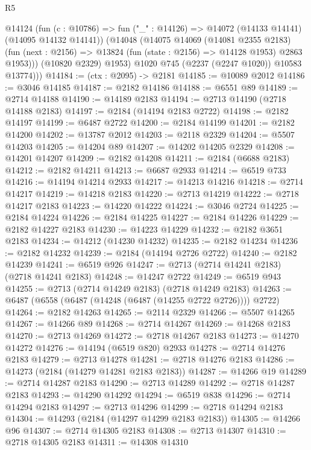 \begin{lexlean}{R5}
\begin{coremodule}
          @14124
            (fun (c : @10786) =>
            fun ("_" : @14126) => @14072 (@14133 @14141) (@14095 @14132 @14141))
            (@14048
              (@14075
                @14069
                (@14081 @2355 @2183)
                (fun (next : @2156) => @13824 (fun (state : @2156) => @14128 @1953) @2863 @1953)))
            (@10820 @2329)
            @1953)
          @1020
          @745
          (@2237 (@2247 @1020))
          @10583
          @13774)))
@14184 := (ctx : @2095) -> @2181
@14185 := @10089 @2012
@14186 := @3046 @14185
@14187 := @2182 @14186
@14188 := @6551 @89
@14189 := @2714 @14188
@14190 := @14189 @2183
@14194 := @2713 @14190 (@2718 @14188 @2183)
@14197 := @2184 (@14194 @2183 @2722)
@14198 := @2182 @14197
@14199 := @6487 @2722
@14200 := @2184 @14199
@14201 := @2182 @14200
@14202 := @13787 @2012
@14203 := @2118 @2329
@14204 := @5507 @14203
@14205 := @14204 @89
@14207 := @14202 @14205 @2329
@14208 := @14201 @14207
@14209 := @2182 @14208
@14211 := @2184 (@6688 @2183)
@14212 := @2182 @14211
@14213 := @6687 @2933
@14214 := @6519 @733
@14216 := @14194 @14214 @2933
@14217 := @14213 @14216
@14218 := @2714 @14217
@14219 := @14218 @2183
@14220 := @2713 @14219
@14222 := @2718 @14217 @2183
@14223 := @14220 @14222
@14224 := @3046 @2724
@14225 := @2184 @14224
@14226 := @2184 @14225
@14227 := @2184 @14226
@14229 := @2182 @14227 @2183
@14230 := @14223 @14229
@14232 := @2182 @3651 @2183
@14234 := @14212 (@14230 @14232)
@14235 := @2182 @14234
@14236 := @2182 @14232
@14239 := @2184 (@14194 @2726 @2722)
@14240 := @2182 @14239
@14241 := @6519 @926
@14247 := @2713 (@2714 @14241 @2183) (@2718 @14241 @2183)
@14248 := @14247 @2722
@14249 := @6519 @943
@14255 := @2713 (@2714 @14249 @2183) (@2718 @14249 @2183)
@14263 := @6487 (@6558 (@6487 (@14248 (@6487 (@14255 @2722 @2726)))) @2722)
@14264 := @2182 @14263
@14265 := @2114 @2329
@14266 := @5507 @14265
@14267 := @14266 @89
@14268 := @2714 @14267
@14269 := @14268 @2183
@14270 := @2713 @14269
@14272 := @2718 @14267 @2183
@14273 := @14270 @14272
@14276 := @14194 (@6519 @820) @2933
@14278 := @2714 @14276 @2183
@14279 := @2713 @14278
@14281 := @2718 @14276 @2183
@14286 := @14273 (@2184 (@14279 @14281 @2183 @2183))
@14287 := @14266 @19
@14289 := @2714 @14287 @2183
@14290 := @2713 @14289
@14292 := @2718 @14287 @2183
@14293 := @14290 @14292
@14294 := @6519 @838
@14296 := @2714 @14294 @2183
@14297 := @2713 @14296
@14299 := @2718 @14294 @2183
@14304 := @14293 (@2184 (@14297 @14299 @2183 @2183))
@14305 := @14266 @96
@14307 := @2714 @14305 @2183
@14308 := @2713 @14307
@14310 := @2718 @14305 @2183
@14311 := @14308 @14310

\end{coremodule}
\end{lexlean}
